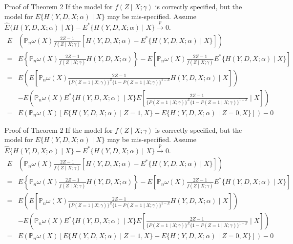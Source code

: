\documentclass[aspectratio=169,xcolor=dvipsnames]{beamer}
\begin{document}
\begin{frame}{Proof of Theorem 2}
If the model for $f(Z \mid X ; \gamma)$ is correctly specified, but the model for $E\{H(Y, D, X ; \alpha) \mid X\}$ may be mis-specified. Assume $\widehat{E}\{H(Y, D, X ; \alpha) \mid X\}-E^{*}\{H(Y, D, X ; \alpha) \mid X\} \stackrel{p}{\rightarrow} 0$.
$$
\begin{aligned}
E&\left(\mathbb{P}_{n} \omega(X) \frac{2 Z-1}{f(Z \mid X ; \gamma)}\left[H(Y, D, X ; \alpha)-E^{*}\{H(Y, D, X ; \alpha) \mid X\}\right]\right) \\
=& E\left\{\mathbb{P}_{n} \omega(X) \frac{2 Z-1}{f(Z \mid X ; \gamma)} H(Y, D, X ; \alpha)\right\}-E\left[\mathbb{P}_{n} \omega(X) \frac{2 Z-1}{f(Z \mid X ; \gamma)} E^{*}\{H(Y, D, X ; \alpha) \mid X\}\right] \\
=& E\left(E\left[\mathbb{P}_{n} \omega(X) \frac{2 Z-1}{\{P(Z=1 \mid X ; \gamma)\}^{Z}\{1-P(Z=1 \mid X ; \gamma)\}^{1-Z}} H(Y, D, X ; \alpha) \mid X\right]\right) \\
&-E\left(\mathbb{P}_{n} \omega(X) E^{*}\{H(Y, D, X ; \alpha) \mid X\} E\left[\frac{2 Z-1}{\{P(Z=1 \mid X ; \gamma)\}^{Z}\{1-P(Z=1 \mid X ; \gamma)\}^{1-Z}} \mid X\right]\right) \\
=& E\left(\mathbb{P}_{n} \omega(X)[E\{H(Y, D, X ; \alpha) \mid Z=1, X\}-E\{H(Y, D, X ; \alpha) \mid Z=0, X\}]\right)-0
\end{aligned}
$$
\end{frame}

\begin{frame}{Proof of Theorem 2}
If the model for $f(Z \mid X ; \gamma)$ is correctly specified, but the model for $E\{H(Y, D, X ; \alpha) \mid X\}$ may be mis-specified. Assume $\widehat{E}\{H(Y, D, X ; \alpha) \mid X\}-E^{*}\{H(Y, D, X ; \alpha) \mid X\} \stackrel{p}{\rightarrow} 0$.
$$
\begin{aligned}
E&\left(\mathbb{P}_{n} \omega(X) \frac{2 Z-1}{f(Z \mid X ; \gamma)}\left[H(Y, D, X ; \alpha)-E^{*}\{H(Y, D, X ; \alpha) \mid X\}\right]\right) \\
=& E\left\{\mathbb{P}_{n} \omega(X) \frac{2 Z-1}{f(Z \mid X ; \gamma)} H(Y, D, X ; \alpha)\right\}-E\left[\mathbb{P}_{n} \omega(X) \frac{2 Z-1}{f(Z \mid X ; \gamma)} E^{*}\{H(Y, D, X ; \alpha) \mid X\}\right] \\
=& E\left(E\left[\mathbb{P}_{n} \omega(X) \frac{2 Z-1}{\{P(Z=1 \mid X ; \gamma)\}^{Z}\{1-P(Z=1 \mid X ; \gamma)\}^{1-Z}} H(Y, D, X ; \alpha) \mid X\right]\right) \\
&-E\left(\mathbb{P}_{n} \omega(X) E^{*}\{H(Y, D, X ; \alpha) \mid X\} E\left[\frac{2 Z-1}{\{P(Z=1 \mid X ; \gamma)\}^{Z}\{1-P(Z=1 \mid X ; \gamma)\}^{1-Z}} \mid X\right]\right) \\
=& E\left(\mathbb{P}_{n} \omega(X)[E\{H(Y, D, X ; \alpha) \mid Z=1, X\}-E\{H(Y, D, X ; \alpha) \mid Z=0, X\}]\right)-0
\end{aligned}
$$
\end{frame}
\end{document}
